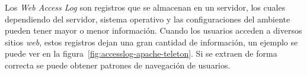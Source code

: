 Los \emph{Web Access Log} son registros que se almacenan en un servidor, los cuales dependiendo del servidor, sistema operativo y las configuraciones del ambiente pueden tener mayor o menor información. Cuando los usuarios acceden a diversos sitios \emph{web}, estos registros dejan una gran cantidad de información, un ejemplo se puede ver en la figura~\ref{fig:accesslog-apache-teleton}. Si se extraen de forma correcta se puede obtener patrones de navegación de usuarios. 